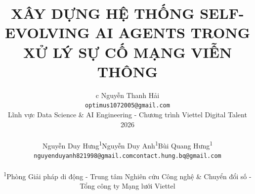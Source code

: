 \documentclass[10pt,twocolumn,letterpaper]{article}
\title{XÂY DỰNG HỆ THỐNG SELF-EVOLVING AI AGENTS TRONG XỬ LÝ SỰ CỐ MẠNG VIỄN THÔNG}
\author{
\begin{tabular}{c}
Nguyễn Thanh Hải\\
{\tt\small optimus1072005@gmail.com}\\
{\small Lĩnh vực Data Science \& AI Engineering - Chương trình Viettel Digital Talent 2026}\\[1.0em]
\begin{tabular}{>{\centering\arraybackslash}p{0.28\textwidth}@{\hspace{0.8em}}>{\centering\arraybackslash}p{0.28\textwidth}@{\hspace{0.8em}}>{\centering\arraybackslash}p{0.28\textwidth}}
Nguyễn Duy Hưng\textsuperscript{1} &
Nguyễn Duy Anh\textsuperscript{1} &
Bùi Quang Hưng\textsuperscript{1}\\
{\tt\small hungnd1235@gmail.com} &
{\tt\small nguyenduyanh821998@gmail.com} &
{\tt\small contact.hung.bq@gmail.com}
\end{tabular}\\[0.65em]
{\small \textsuperscript{1}Phòng Giải pháp di động - Trung tâm Nghiên cứu Công nghệ \& Chuyển đổi số - Tổng công ty Mạng lưới Viettel}
\end{tabular}
}
\begin{document}
\maketitle







{
    \small
    \renewcommand{\refname}{TÀI LIỆU THAM KHẢO}
    
    
}
\end{document}
